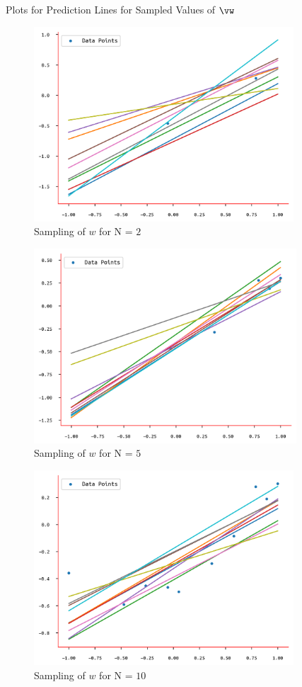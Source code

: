 \documentclass{article}
\begin{document}
\begin{question}
\begin{qsection}{Plots for Prediction Lines for Sampled Values of $\vw$}
		\begin{figure}[h!]
			\centering
			\includegraphics[height=275px]{includes/plots/q4c/predictive-models-2.png}
			\caption{Sampling of $w$ for N = $2$}
		\end{figure}

		\begin{figure}[h!]
			\centering
			\includegraphics[height=275px]{includes/plots/q4c/predictive-models-3.png}
			\caption{Sampling of $w$ for N = $5$}
		\end{figure}

		\begin{figure}[h!]
			\centering
			\includegraphics[height=275px]{includes/plots/q4c/predictive-models-4.png}
			\caption{Sampling of $w$ for N = $10$}
		\end{figure}


\end{qsection}
\end{question}
\end{document}
